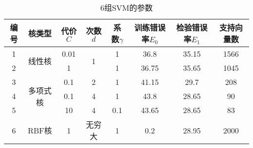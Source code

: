 {\small
\begin{table}[htbp]
  \centering
  \caption{6组SVM的参数}
    \begin{tabular}{cccccccc}
    \toprule
    {编号} & {核类型} & {代价$C$} & {次数$d$} & {系数$\gamma$} & {训练错误率$E_0$} & {检验错误率$E_1$} & {支持向量数} \\
    \midrule
    1     & \multirow{2}[1]{*}{线性核} & 0.01  & \multirow{2}[1]{*}{1} & 1     & 36.8  & 35.15 & 1566 \\
    2     &       & 1     &       & 1     & 36.75 & 35.65 & 1045 \\ \midrule
    3     & \multirow{3}[0]{*}{多项式核} & 0.1   & 2     & 1     & 41.15 & 29.7  & 208 \\
    4     &       & 0.1   & 4     & 1     & 43.8  & 28.65 & 90 \\
    5     &       & 10    & 4     & 0.1   & 43.65 & 28.65 & 83 \\ \midrule
    6     & RBF核  & 1     & 无穷大   & 1     & 0.2   & 28.95 & 2000 \\
   \bottomrule
    \end{tabular}%
  \label{tab:addlabel}%
\end{table}%
}
